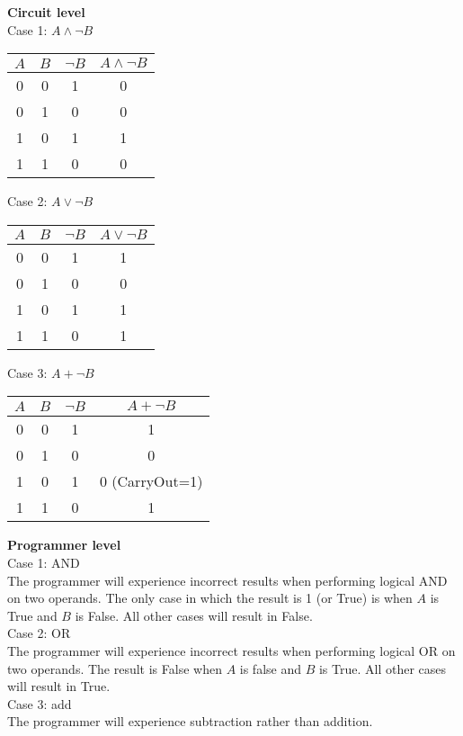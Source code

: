 \documentclass[10pt,letterpaper]{article}
\begin{document}
\textbf{Circuit level}\\
Case 1: $A \land \neg B$
\begin{center}
\begin{tabular} { |c|c|c|c| }
\hline
$A$ & $B$ & $\neg B$ & $A \land \neg B$ \\
\hline
0 & 0 & 1 & 0 \\
\hline
0 & 1 & 0 & 0 \\
\hline
1 & 0 & 1 & 1 \\
\hline
1 & 1 & 0 & 0 \\
\hline
\end{tabular}
\end{center}
Case 2: $A \lor \neg B$
\begin{center}
\begin{tabular} { |c|c|c|c| }
\hline
$A$ & $B$ & $\neg B$ & $A \lor \neg B$ \\
\hline
0 & 0 & 1 & 1 \\
\hline
0 & 1 & 0 & 0 \\
\hline
1 & 0 & 1 & 1 \\
\hline
1 & 1 & 0 & 1 \\
\hline
\end{tabular}
\end{center}
Case 3: $A + \neg B$
\begin{center}
\begin{tabular} { |c|c|c|c| }
\hline
$A$ & $B$ & $\neg B$ & $A + \neg B$ \\
\hline
0 & 0 & 1 & 1 \\
\hline
0 & 1 & 0 & 0 \\
\hline
1 & 0 & 1 & 0 (CarryOut=1)\\
\hline
1 & 1 & 0 & 1 \\
\hline
\end{tabular}
\end{center}
\textbf{Programmer level}\\
Case 1: AND\\
The programmer will experience incorrect results when performing logical AND on two operands. The only case in which the result is 1 (or True) is when $A$ is True and $B$ is False. All other cases will result in False.\\
Case 2: OR\\
The programmer will experience incorrect results when performing logical OR on two operands. The result is False when $A$ is false and $B$ is True. All other cases will result in True.\\
Case 3: add\\
The programmer will experience subtraction rather than addition.
\pagebreak
\end{document}
